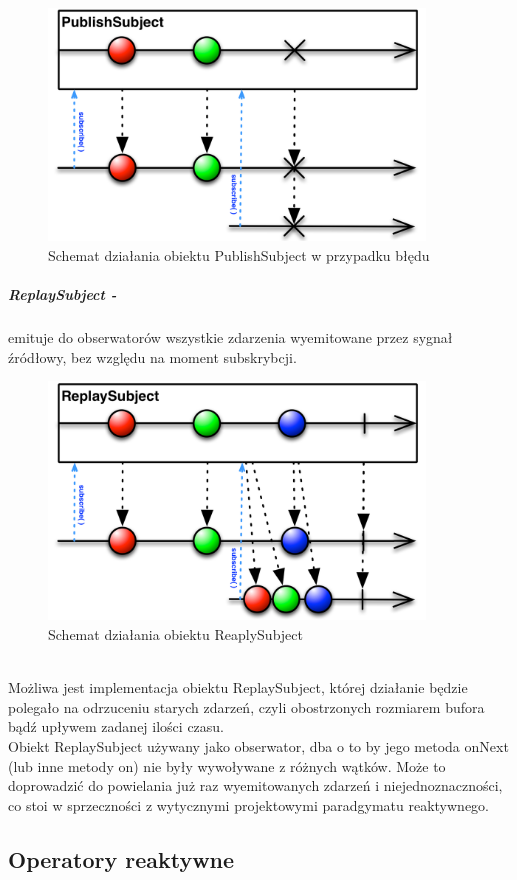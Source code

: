 \documentclass[12pt,oneside,a4paper]{report}
\begin{document}
\begin{figure}[ht!]
	\centering
	\includegraphics[width=10cm]{publishSubjectFailed}
	\caption{Schemat działania obiektu PublishSubject w przypadku błędu}
	\label{publishSubjectFailed}
\end{figure}
\subparagraph{ReplaySubject -}emituje do obserwatorów wszystkie zdarzenia wyemitowane przez sygnał źródłowy, bez względu na moment subskrybcji. 
\begin{figure}[ht!]
	\centering
	\includegraphics[width=10cm]{replaySubject}
	\caption{Schemat działania obiektu ReaplySubject}
	\label{replaySubject}
\end{figure}\\
Możliwa jest implementacja obiektu ReplaySubject, której działanie będzie polegało na odrzuceniu starych zdarzeń, czyli obostrzonych rozmiarem bufora bądź upływem zadanej ilości czasu.\\
Obiekt ReplaySubject używany jako obserwator, dba o to by jego metoda onNext (lub inne metody on) nie były wywoływane z różnych wątków. Może to doprowadzić do powielania już raz wyemitowanych zdarzeń i niejednoznaczności, co stoi w sprzeczności z wytycznymi projektowymi paradgymatu reaktywnego.\cite{rxDesignGuideline} 
\subsection{Operatory reaktywne}
\end{document}
